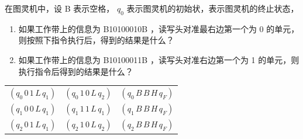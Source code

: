 \documentclass[../../main.tex]{subfiles}
\begin{document}
\begin{problem}
在图灵机中，设 B 表示空格， \(q_0\) 表示图灵机的初始状，表示图灵机的终止状态，
\begin{enumerate}
    \item 如果工作带上的信息为 B10100010B ，读写头对准最右边第一个为 0 的单元，则按照下指令执行后，得到的结果是什么？
    \item 如果工作带上的信息为 B10100011B ，读写头对准右边第一个为 1 的单元，则执行指令后得到的结果是什么？
\end{enumerate}
\begin{table}[H]
    \centering
    \begin{tabular}{ccc}
        \((q_0 \, 0 \, 1 \, L \, q_1)\) & \((q_0 \, 1 \, 0 \, L \, q_2)\) & \((q_0 \, B \, B \, H \, q_F)\) \\
        \((q_1 \, 0 \, 0 \, L \, q_1)\) & \((q_1 \, 1 \, 1 \, L \, q_1)\) & \((q_1 \, B \, B \, H \, q_F)\) \\
        \((q_2 \, 0 \, 1 \, L \, q_1)\) & \((q_2 \, 1 \, 0 \, L \, q_2)\) & \((q_2 \, B \, B \, H \, q_F)\) \\
    \end{tabular}
\end{table}
\end{problem}
\end{document}
